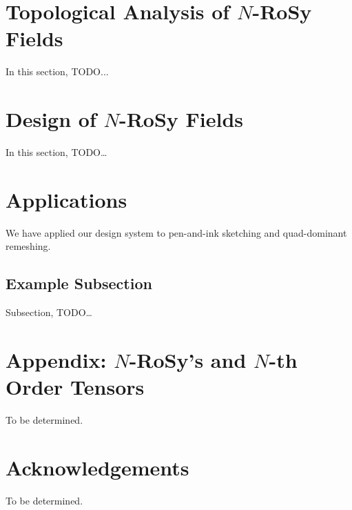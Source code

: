 \documentclass{acmsiggraph}               %
\begin{document}
\section{Topological Analysis of $N$-RoSy Fields}
\label{sec:analysis}

In this section, TODO...

\section{Design of $N$-RoSy Fields}
\label{sec:design}

In this section, TODO\dots



\section{Applications}
\label{sec:application}

We have applied our design system to pen-and-ink sketching and
quad-dominant remeshing.


\subsection{Example Subsection}
\label{sec:pen_and_ink}

Subsection, TODO\dots



\section*{Appendix: $N$-RoSy's and $N$-th Order Tensors}
\label{sec:higher_tensors}

To be determined.

\section*{Acknowledgements}

To be determined.



\nocite{*}

\end{document}
